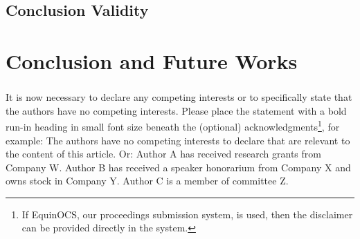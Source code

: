 \documentclass[runningheads]{llncs}
\begin{document}
\subsection{Conclusion Validity}


\section{Conclusion and Future Works}



\begin{credits}
\subsubsection{\discintname}
It is now necessary to declare any competing interests or to specifically
state that the authors have no competing interests. Please place the
statement with a bold run-in heading in small font size beneath the
(optional) acknowledgments\footnote{If EquinOCS, our proceedings submission
system, is used, then the disclaimer can be provided directly in the system.},
for example: The authors have no competing interests to declare that are
relevant to the content of this article. Or: Author A has received research
grants from Company W. Author B has received a speaker honorarium from
Company X and owns stock in Company Y. Author C is a member of committee Z.
\end{credits}
%
%


\end{document}

